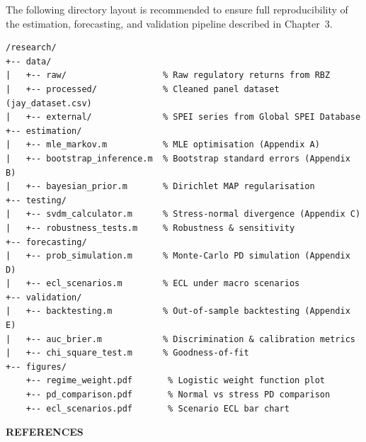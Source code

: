 \documentclass[12pt,a4paper]{article}
\begin{document}
The following directory layout is recommended to ensure full reproducibility of the estimation, forecasting, and validation pipeline described in Chapter~3.

\begin{verbatim}
/research/
+-- data/
|   +-- raw/                   % Raw regulatory returns from RBZ
|   +-- processed/             % Cleaned panel dataset (jay_dataset.csv)
|   +-- external/              % SPEI series from Global SPEI Database
+-- estimation/
|   +-- mle_markov.m           % MLE optimisation (Appendix A)
|   +-- bootstrap_inference.m  % Bootstrap standard errors (Appendix B)
|   +-- bayesian_prior.m       % Dirichlet MAP regularisation
+-- testing/
|   +-- svdm_calculator.m      % Stress-normal divergence (Appendix C)
|   +-- robustness_tests.m     % Robustness & sensitivity
+-- forecasting/
|   +-- prob_simulation.m      % Monte-Carlo PD simulation (Appendix D)
|   +-- ecl_scenarios.m        % ECL under macro scenarios
+-- validation/
|   +-- backtesting.m          % Out-of-sample backtesting (Appendix E)
|   +-- auc_brier.m            % Discrimination & calibration metrics
|   +-- chi_square_test.m      % Goodness-of-fit
+-- figures/
    +-- regime_weight.pdf       % Logistic weight function plot
    +-- pd_comparison.pdf       % Normal vs stress PD comparison
    +-- ecl_scenarios.pdf       % Scenario ECL bar chart
\end{verbatim}

\newpage

\begin{center}
    {\LARGE\bfseries REFERENCES}
\end{center}

\vspace{0.5cm}
\end{document}
